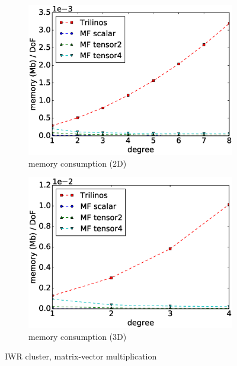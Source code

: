 \documentclass[preprint,12pt,times]{elsarticle}
\begin{document}
\begin{figure}[!ht]
\begin{subfigure}[b]{0.49\textwidth}
      \includegraphics[width=\textwidth]{IWR_memory2d.eps}
      \caption{memory consumption (2D)}
      \label{fig:benchmark_miehe_IWR_memory2}
  \end{subfigure}
  \begin{subfigure}[b]{0.49\textwidth}
    \centering
    \includegraphics[width=\textwidth]{IWR_memory3d.eps}
    \caption{memory consumption (3D)}
    \label{fig:benchmark_miehe_IWR_memory3}
  \end{subfigure}
  \caption{IWR cluster, matrix-vector multiplication}%
  \label{fig:benchmark_miehe_IWR}
\end{figure}
\end{document}
